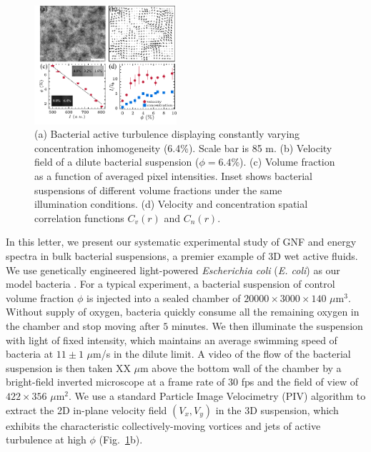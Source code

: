 \documentclass[twocolumn,aps,prl,amsmath,amssymb,longbibliography]{revtex4-2}
\begin{document}



\begin{figure}[ht]
\begin{center}
\includegraphics[width=0.47\textwidth]{Figures/experiment/v1.pdf}
\caption[Experimental details]
{
(a) Bacterial active turbulence displaying constantly varying concentration inhomogeneity (6.4\%). Scale bar is 85 \textmu m.
(b) Velocity field of a dilute bacterial suspension ($\phi=6.4\%$).
(c) Volume fraction as a function of averaged pixel intensities. Inset shows bacterial suspensions of different volume fractions under the same illumination conditions.
(d) Velocity and concentration spatial correlation functions $C_{v}(r)$ and $C_{n}(r)$.
}
\label{fig:experiment}
\end{center}
\end{figure}

In this letter, we present our systematic experimental study of GNF and energy spectra in bulk bacterial suspensions, a premier example of 3D wet active fluids. We use genetically engineered light-powered \textit{Escherichia coli} (\textit{E. coli}) as our model bacteria \cite{Liu2020}.
For a typical experiment, a bacterial suspension of control volume fraction $\phi$ is injected into a sealed chamber of $20000 \times 3000 \times 140$ $\mu$m$^3$.
Without supply of oxygen, bacteria quickly consume all the remaining oxygen in the chamber and stop moving after $5$ minutes.
We then illuminate the suspension with light
of fixed intensity, which maintains an average swimming speed of bacteria at $11 \pm 1$ $\mu$m/s in the dilute limit.
A video of the flow of the bacterial suspension is then taken XX $\mu$m above the bottom wall of the chamber by a bright-field inverted microscope at a frame rate of $30$ fps and the field of view of $422 \times 356$ $\mu$m$^2$.
We use a standard Particle Image Velocimetry (PIV) algorithm to extract the 2D in-plane velocity field $(V_x,V_y)$ in the 3D suspension, which exhibits the characteristic collectively-moving vortices and jets of active turbulence at high $\phi$ (Fig.~\ref{fig:experiment}b).
\end{document}
